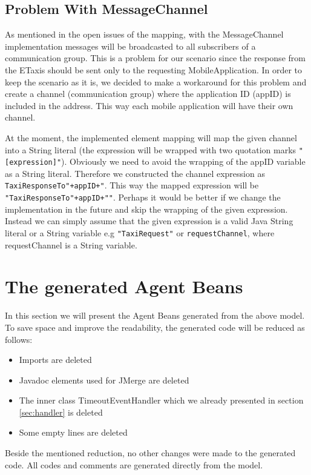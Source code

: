 \subsection{Problem With MessageChannel}
As mentioned in the open issues of the mapping, with the MessageChannel implementation messages will be broadcasted to all subscribers of a communication group. This is a problem for our scenario since the response from the ETaxis should be sent only to the requesting MobileApplication. In order to keep the scenario as it is, we decided to make a workaround for this problem and create a channel (communication group) where the application ID (appID) is included in the address. This way each mobile application will have their own channel. 

\newpage
At the moment, the implemented element mapping will map the given channel into a String literal (the expression will be wrapped with two quotation marks \verb|"[expression]"|). Obviously we need to avoid the wrapping of the appID variable as a String literal. Therefore we constructed the channel expression as \verb|TaxiResponseTo"+appID+"|. This way the mapped expression will be \verb|"TaxiResponseTo"+appID+""|. Perhaps it would be better if we change the implementation in the future and skip the wrapping of the given expression. Instead we can simply assume that the given expression is a valid Java String literal or a String variable e.g \verb|"TaxiRequest"| or \verb|requestChannel|, where requestChannel is a String variable.

\section{The generated Agent Beans}
In this section we will present the Agent Beans generated from the above model. To save space and improve the readability, the generated code will be reduced as follows:
\begin{itemize}
	\item Imports are deleted
	\item Javadoc elements used for JMerge are deleted
	\item The inner class TimeoutEventHandler which we already presented in section \ref{sec:handler} is deleted
	\item Some empty lines are deleted
\end{itemize}
Beside the mentioned reduction, no other changes were made to the generated code. All codes and comments are generated directly from the model.

